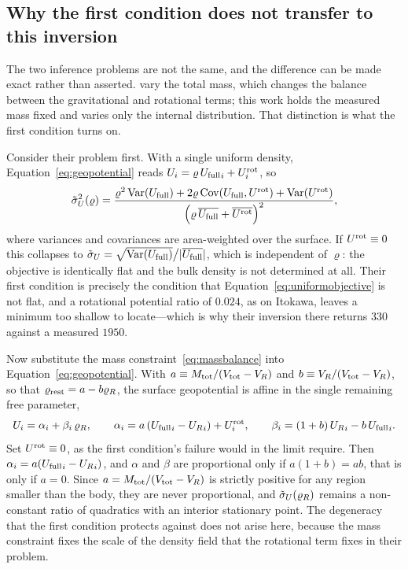 \subsection{Why the first condition does not transfer to this inversion}
\label{sec:discussion:conditioning}

The two inference problems are not the same, and the difference can be made
exact rather than asserted. \citet{richardson2014} vary the total mass,
which changes the balance between the gravitational and rotational terms;
this work holds the measured mass fixed and varies only the internal
distribution. That distinction is what the first condition turns on.

Consider their problem first. With a single uniform density,
Equation~\eqref{eq:geopotential} reads
${U}_i = \varrho\,{U_{\mathrm{full}}}_i + U^{\mathrm{rot}}_i$, so
%
\begin{equation}
\tilde{\sigma}_{U}^{2}(\varrho)
 = \frac{\varrho^{2}\operatorname{Var}(U_{\mathrm{full}})
        + 2\varrho\operatorname{Cov}(U_{\mathrm{full}},U^{\mathrm{rot}})
        + \operatorname{Var}(U^{\mathrm{rot}})}
        {\left(\varrho\,\overline{U_{\mathrm{full}}}+\overline{U^{\mathrm{rot}}}\right)^{2}} ,
\label{eq:uniformobjective}
\end{equation}
%
where variances and covariances are area-weighted over the surface. If
$U^{\mathrm{rot}} \equiv 0$ this collapses to
$\tilde{\sigma}_{U} = \sqrt{\operatorname{Var}(U_{\mathrm{full}})}\big/\lvert\overline{U_{\mathrm{full}}}\rvert$,
which is independent of $\varrho$: the objective is identically flat and the
bulk density is not determined at all. Their first condition is precisely
the condition that Equation~\eqref{eq:uniformobjective} is not flat, and a
rotational potential ratio of $0.024$, as on Itokawa, leaves a minimum too
shallow to locate---which is why their inversion there returns $330$ against
a measured $1950$.

Now substitute the mass constraint~\eqref{eq:massbalance} into
Equation~\eqref{eq:geopotential}. With
$a \equiv M_{\mathrm{tot}}/(V_{\mathrm{tot}}-V_{R})$ and $b \equiv V_{R}/(V_{\mathrm{tot}}-V_{R})$, so that
$\varrho_{\mathrm{rest}} = a - b\varrho_{R}$, the surface geopotential is affine in the single
remaining free parameter,
%
\begin{equation}
{U}_i = {\alpha}_i + {\beta}_i\,\varrho_{R} ,
\qquad
{\alpha}_i = a\left({U_{\mathrm{full}}}_i - {U_{R}}_i\right) + U^{\mathrm{rot}}_i ,
\qquad
{\beta}_i = (1+b)\,{U_{R}}_i - b\,{U_{\mathrm{full}}}_i .
\label{eq:affine}
\end{equation}
%
Set $U^{\mathrm{rot}} \equiv 0$, as the first condition's failure would in the limit
require. Then ${\alpha}_i = a({U_{\mathrm{full}}}_i - {U_{R}}_i)$, and $\alpha$ and $\beta$ are
proportional only if $a(1+b) = ab$, that is only if $a = 0$. Since
$a = M_{\mathrm{tot}}/(V_{\mathrm{tot}}-V_{R})$ is strictly positive for any region smaller than the
body, they are never proportional, and $\tilde{\sigma}_{U}(\varrho_{R})$ remains a
non-constant ratio of quadratics with an interior stationary point. The
degeneracy that the first condition protects against does not arise here,
because the mass constraint fixes the scale of the density field that the
rotational term fixes in their problem.

